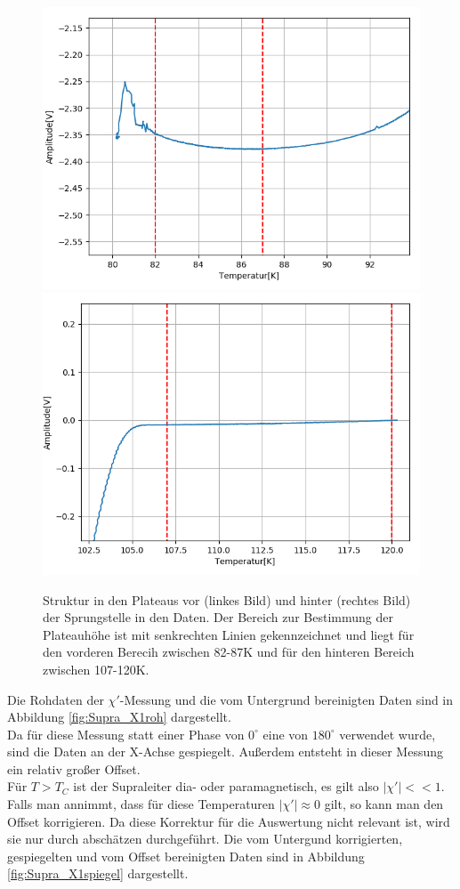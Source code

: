 \documentclass[12pt,a4paper]{article}
\begin{document}
\begin{figure}
\centering
\includegraphics[scale=0.5]{Bilder/Haupt_Supra/X1unten.png}
\includegraphics[scale=0.5]{Bilder/Haupt_Supra/X1oben.png}
\caption{Struktur in den Plateaus vor (linkes Bild) und hinter (rechtes Bild) der Sprungstelle in den Daten. Der Bereich zur Bestimmung der Plateauhöhe ist mit senkrechten Linien gekennzeichnet und liegt für den vorderen Berecih zwischen 82-87K und für den hinteren Bereich zwischen 107-120K.}
\label{fig:Supra_X1struct}
\end{figure}

Die Rohdaten der $\chi'$-Messung und die vom Untergrund bereinigten Daten sind in Abbildung \ref{fig:Supra_X1roh} dargestellt.\\
Da für diese Messung statt einer Phase von $0^\circ$ eine von $180^\circ$ verwendet wurde, sind die Daten an der X-Achse gespiegelt. Außerdem entsteht in dieser Messung ein relativ großer Offset.\\
Für $T>T_C$ ist der Supraleiter dia- oder paramagnetisch, es gilt also $|\chi'| << 1$. Falls man annimmt, dass für diese Temperaturen $|\chi'| \approx 0$ gilt, so kann man den Offset korrigieren. Da diese Korrektur für die Auswertung nicht relevant ist, wird sie nur durch abschätzen durchgeführt.
Die vom Untergund korrigierten, gespiegelten und vom Offset bereinigten Daten sind in Abbildung \ref{fig:Supra_X1spiegel} dargestellt. 
\end{document}
